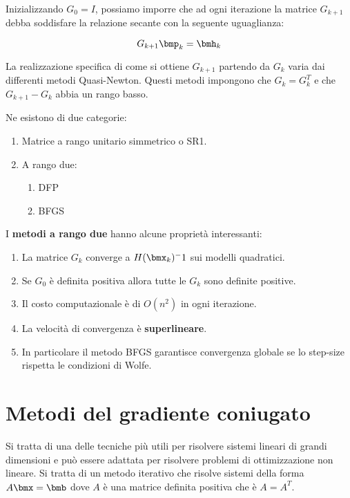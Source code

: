 \documentclass[\main/main.tex]{subfiles}
\begin{document}
Inizializzando \(G_0 = I\), possiamo imporre che ad ogni iterazione la matrice \(G_{k+1}\) debba soddisfare la relazione secante con la seguente uguaglianza:

\[
    G_{k+1}\bmp_k = \bmh_k
\]

La realizzazione specifica di come si ottiene \(G_{k+1}\) partendo da \(G_k\) varia dai differenti metodi Quasi-Newton. Questi metodi impongono che \(G_k = G_k^T\) e che \(G_{k+1} - G_k\) abbia un rango basso.

Ne esistono di due categorie:

\begin{enumerate}
    \item Matrice a rango unitario simmetrico o SR1.
    \item A rango due:
          \begin{enumerate}
              \item DFP
              \item BFGS
          \end{enumerate}
\end{enumerate}

I \textbf{metodi a rango due} hanno alcune proprietà interessanti:

\begin{enumerate}
    \item La matrice \(G_k\) converge a \(H(\bmx_k)^-1\) sui modelli quadratici.
    \item Se \(G_0\) è definita positiva allora tutte le \(G_k\) sono definite positive.
    \item Il costo computazionale è di \(O(n^2)\) in ogni iterazione.
    \item La velocità di convergenza è \textbf{superlineare}.
    \item In particolare il metodo BFGS garantisce convergenza globale se lo step-size rispetta le condizioni di Wolfe.
\end{enumerate}

\section{Metodi del gradiente coniugato}
Si tratta di una delle tecniche più utili per risolvere sistemi lineari di grandi dimensioni e può essere adattata per risolvere problemi di ottimizzazione non lineare. Si tratta di un metodo iterativo che risolve sistemi della forma \(A\bmx = \bmb \) dove \(A\) è una matrice definita positiva che è \(A=A^T\).
\end{document}
